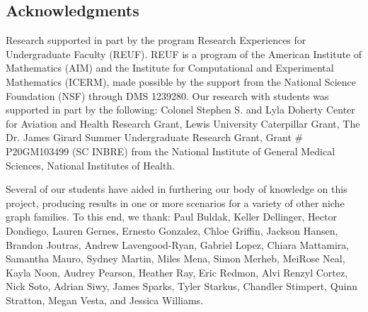 \documentclass{elsarticle}
\theoremstyle{definition}
\theoremstyle{remark}
\theoremstyle{plain}
\theoremstyle{plain}
\begin{document}
\subsection{Acknowledgments}
Research supported in part by the program Research Experiences for Undergraduate Faculty (REUF). REUF is a program of the American Institute of Mathematics (AIM) and the Institute for Computational and Experimental Mathematics (ICERM), made possible by the support from the National Science Foundation (NSF) through DMS 1239280. Our research with students was supported in part by the following: Colonel Stephen S. and Lyla Doherty Center for Aviation and Health Research Grant, Lewis University Caterpillar Grant, The Dr. James Girard Summer Undergraduate Research Grant, Grant \# P20GM103499 (SC INBRE) from the National Institute of General Medical Sciences, National Institutes of Health.\par
Several of our students have aided in furthering our body of knowledge on this project, producing results in one or more scenarios for a variety of other niche graph families. To this end, we thank: Paul Buldak, 
Keller Dellinger, 
Hector Dondiego,   
Lauren Gernes, 
Ernesto Gonzalez, 
Chloe Griffin, 
Jackson Hansen,  
Brandon Joutras, 
Andrew Lavengood-Ryan, 
Gabriel Lopez, 
Chiara Mattamira, 
Samantha Mauro,
Sydney Martin,
Miles Mena, 
Simon Merheb, 
MeiRose Neal, 
Kayla Noon, 
Audrey Pearson, 
Heather Ray, 
Eric Redmon, 
Alvi Renzyl Cortez, 
Nick Soto, 
Adrian Siwy, 
James Sparks, 
Tyler Starkus, 
Chandler Stimpert, 
Quinn Stratton, 
Megan Vesta,
and
Jessica Williams.
\appendix
\label{appendix}

\newpage

 

\end{document}
